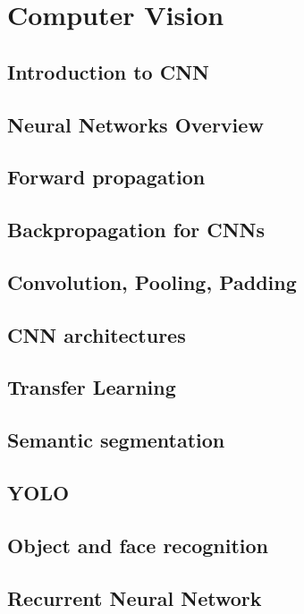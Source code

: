\documentclass[11pt,fleqn]{book} %
\begin{document}
\part{Computer Vision}


\chapter{Introduction to CNN}
\chapter{Neural Networks Overview}
\chapter{Forward propagation}
\chapter{Backpropagation for CNNs}
\chapter{Convolution, Pooling, Padding}
\chapter{CNN architectures}
\chapter{Transfer Learning}
\chapter{Semantic segmentation}
\chapter{YOLO}
\chapter{Object and face recognition }
\chapter{Recurrent Neural Network}
\end{document}
